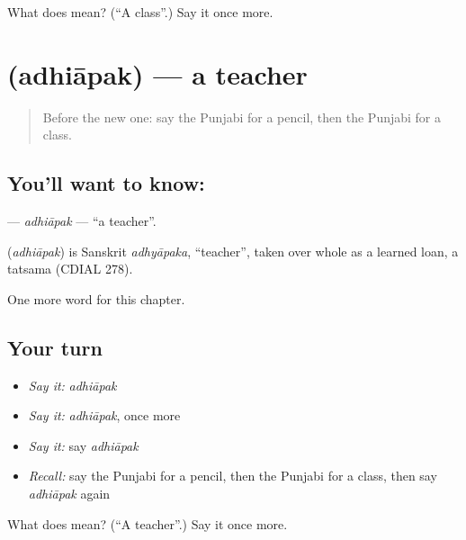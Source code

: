\begin{tcolorbox}[breakable,colback=teal!4,colframe=teal!35!black,title={Before you move on}]
What does  mean? (\textquotedblleft{}A class\textquotedblright{}.) Say it once more.
\end{tcolorbox}
\section[\texorpdfstring{\pa{ਅਧਿਆਪਕ} (adhiāpak)}{ਅਧਿਆਪਕ (adhiāpak)}]{ (adhiāpak) — a teacher}

\label{lesson:PA-C138-adhiapak}



\begin{quote}
Before the new one: say the Punjabi for a pencil, then the Punjabi for a class.
\end{quote}

\subsection*{You'll want to know: }
\textbf{} — \emph{adhiāpak} — \textquotedblleft{}a teacher\textquotedblright{}.

\begin{cousinweb}
\textbf{} (\emph{adhiāpak}) is Sanskrit \emph{adhyāpaka}, \textquotedblleft{}teacher\textquotedblright{}, taken over whole as a learned loan, a tatsama (CDIAL 278).
\end{cousinweb}

\begin{grammarlens}[title={What you've built}]
One more word for this chapter.
\end{grammarlens}

\subsection*{Your turn}
\begin{itemize}
\raggedright
  \item \emph{Say it:} \emph{adhiāpak}
  \item \emph{Say it:} \emph{adhiāpak}, once more
  \item \emph{Say it:} say \emph{adhiāpak}
  \item \emph{Recall:} say the Punjabi for a pencil, then the Punjabi for a class, then say \emph{adhiāpak} again
\end{itemize}

\begin{tcolorbox}[breakable,colback=teal!4,colframe=teal!35!black,title={Before you move on}]
What does  mean? (\textquotedblleft{}A teacher\textquotedblright{}.) Say it once more.
\end{tcolorbox}
